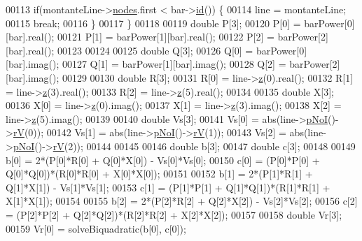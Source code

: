 \begin{DoxyCode}
00113         \textcolor{keywordflow}{if}(montanteLine->\hyperlink{class_line_afd17c40d656e6a8d677cb22df5f0c70b}{nodes}.first < bar->\hyperlink{group___models_gacf0fb781a73856bb7beb823304465e13}{id}()) \{
00114           line = montanteLine;
00115           \textcolor{keywordflow}{break};
00116         \}
00117       \}
00118 
00119       \textcolor{keywordtype}{double} P[3];
00120       P[0] = barPower[0][bar].real();
00121       P[1] = barPower[1][bar].real();
00122       P[2] = barPower[2][bar].real();
00123 
00124 
00125       \textcolor{keywordtype}{double} Q[3];
00126       Q[0] = barPower[0][bar].imag();
00127       Q[1] = barPower[1][bar].imag();
00128       Q[2] = barPower[2][bar].imag();
00129 
00130       \textcolor{keywordtype}{double} R[3];
00131       R[0] = line->\hyperlink{group___models_ga0b44ccb2f14635c42d7eab3fe8940692}{z}(0).real();
00132       R[1] = line->\hyperlink{group___models_ga0b44ccb2f14635c42d7eab3fe8940692}{z}(3).real();
00133       R[2] = line->\hyperlink{group___models_ga0b44ccb2f14635c42d7eab3fe8940692}{z}(5).real();
00134 
00135       \textcolor{keywordtype}{double} X[3];
00136       X[0] = line->\hyperlink{group___models_ga0b44ccb2f14635c42d7eab3fe8940692}{z}(0).imag();
00137       X[1] = line->\hyperlink{group___models_ga0b44ccb2f14635c42d7eab3fe8940692}{z}(3).imag();
00138       X[2] = line->\hyperlink{group___models_ga0b44ccb2f14635c42d7eab3fe8940692}{z}(5).imag();
00139 
00140       \textcolor{keywordtype}{double} Vs[3];
00141       Vs[0] = abs(line->\hyperlink{group___models_gaeafd90e84ac2f8de2a879abe9e53eef3}{pNoI}()->\hyperlink{group___models_ga6c83eb997f5038e0b9bbd5472582e0a8}{rV}(0));
00142       Vs[1] = abs(line->\hyperlink{group___models_gaeafd90e84ac2f8de2a879abe9e53eef3}{pNoI}()->\hyperlink{group___models_ga6c83eb997f5038e0b9bbd5472582e0a8}{rV}(1));
00143       Vs[2] = abs(line->\hyperlink{group___models_gaeafd90e84ac2f8de2a879abe9e53eef3}{pNoI}()->\hyperlink{group___models_ga6c83eb997f5038e0b9bbd5472582e0a8}{rV}(2));
00144 
00145 
00146       \textcolor{keywordtype}{double} b[3];
00147       \textcolor{keywordtype}{double} c[3];
00148 
00149       b[0] = 2*(P[0]*R[0] + Q[0]*X[0]) - Vs[0]*Vs[0];
00150       c[0] = (P[0]*P[0] + Q[0]*Q[0])*(R[0]*R[0] + X[0]*X[0]);
00151 
00152       b[1] = 2*(P[1]*R[1] + Q[1]*X[1]) - Vs[1]*Vs[1];
00153       c[1] = (P[1]*P[1] + Q[1]*Q[1])*(R[1]*R[1] + X[1]*X[1]);
00154 
00155       b[2] = 2*(P[2]*R[2] + Q[2]*X[2]) - Vs[2]*Vs[2];
00156       c[2] = (P[2]*P[2] + Q[2]*Q[2])*(R[2]*R[2] + X[2]*X[2]);
00157 
00158       \textcolor{keywordtype}{double} Vr[3];
00159       Vr[0] = solveBiquadratic(b[0], c[0]);

\end{DoxyCode}
